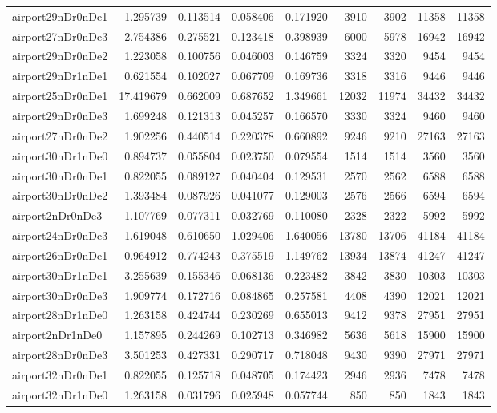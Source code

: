 \begin{longtable}{|l|r|r|r|r|r|r|r|r|}
airport29nDr0nDe1 & 1.295739 & 0.113514 & 0.058406 & 0.171920 & 3910 & 3902 & 11358 & 11358 \\
airport27nDr0nDe3 & 2.754386 & 0.275521 & 0.123418 & 0.398939 & 6000 & 5978 & 16942 & 16942 \\
airport29nDr0nDe2 & 1.223058 & 0.100756 & 0.046003 & 0.146759 & 3324 & 3320 & 9454 & 9454 \\
airport29nDr1nDe1 & 0.621554 & 0.102027 & 0.067709 & 0.169736 & 3318 & 3316 & 9446 & 9446 \\
airport25nDr0nDe1 & 17.419679 & 0.662009 & 0.687652 & 1.349661 & 12032 & 11974 & 34432 & 34432 \\
airport29nDr0nDe3 & 1.699248 & 0.121313 & 0.045257 & 0.166570 & 3330 & 3324 & 9460 & 9460 \\
airport27nDr0nDe2 & 1.902256 & 0.440514 & 0.220378 & 0.660892 & 9246 & 9210 & 27163 & 27163 \\
airport30nDr1nDe0 & 0.894737 & 0.055804 & 0.023750 & 0.079554 & 1514 & 1514 & 3560 & 3560 \\
airport30nDr0nDe1 & 0.822055 & 0.089127 & 0.040404 & 0.129531 & 2570 & 2562 & 6588 & 6588 \\
airport30nDr0nDe2 & 1.393484 & 0.087926 & 0.041077 & 0.129003 & 2576 & 2566 & 6594 & 6594 \\
airport2nDr0nDe3 & 1.107769 & 0.077311 & 0.032769 & 0.110080 & 2328 & 2322 & 5992 & 5992 \\
airport24nDr0nDe3 & 1.619048 & 0.610650 & 1.029406 & 1.640056 & 13780 & 13706 & 41184 & 41184 \\
airport26nDr0nDe1 & 0.964912 & 0.774243 & 0.375519 & 1.149762 & 13934 & 13874 & 41247 & 41247 \\
airport30nDr1nDe1 & 3.255639 & 0.155346 & 0.068136 & 0.223482 & 3842 & 3830 & 10303 & 10303 \\
airport30nDr0nDe3 & 1.909774 & 0.172716 & 0.084865 & 0.257581 & 4408 & 4390 & 12021 & 12021 \\
airport28nDr1nDe0 & 1.263158 & 0.424744 & 0.230269 & 0.655013 & 9412 & 9378 & 27951 & 27951 \\
airport2nDr1nDe0 & 1.157895 & 0.244269 & 0.102713 & 0.346982 & 5636 & 5618 & 15900 & 15900 \\
airport28nDr0nDe3 & 3.501253 & 0.427331 & 0.290717 & 0.718048 & 9430 & 9390 & 27971 & 27971 \\
airport32nDr0nDe1 & 0.822055 & 0.125718 & 0.048705 & 0.174423 & 2946 & 2936 & 7478 & 7478 \\
airport32nDr1nDe0 & 1.263158 & 0.031796 & 0.025948 & 0.057744 & 850 & 850 & 1843 & 1843 \\

\end{longtable}
